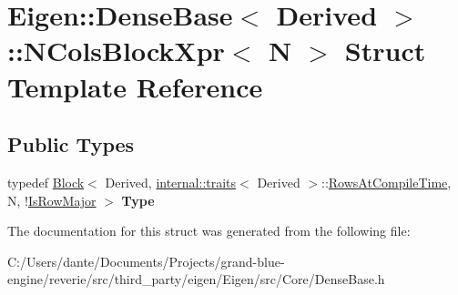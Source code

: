\hypertarget{struct_eigen_1_1_dense_base_1_1_n_cols_block_xpr}{}\section{Eigen\+::Dense\+Base$<$ Derived $>$\+::N\+Cols\+Block\+Xpr$<$ N $>$ Struct Template Reference}
\label{struct_eigen_1_1_dense_base_1_1_n_cols_block_xpr}
\subsection*{Public Types}
\begin{DoxyCompactItemize}
\item 
\mbox{\label{struct_eigen_1_1_dense_base_1_1_n_cols_block_xpr_a30874549fb3d98a13c7f8fd7f04bc3d8}} 
typedef \mbox{\hyperlink{class_eigen_1_1_block}{Block}}$<$ Derived, \mbox{\hyperlink{struct_eigen_1_1internal_1_1traits}{internal\+::traits}}$<$ Derived $>$\+::\mbox{\hyperlink{class_eigen_1_1_dense_base_a86241c772c74c04eeeb0480b99c5ab77adb37c78ebbf15aa20b65c3b70415a1ab}{Rows\+At\+Compile\+Time}}, N, !\mbox{\hyperlink{class_eigen_1_1_dense_base_a86241c772c74c04eeeb0480b99c5ab77a406b6af91d61d348ba1c9764bdd66008}{Is\+Row\+Major}} $>$ {\bfseries Type}
\end{DoxyCompactItemize}


The documentation for this struct was generated from the following file\+:\begin{DoxyCompactItemize}
\item 
C\+:/\+Users/dante/\+Documents/\+Projects/grand-\/blue-\/engine/reverie/src/third\+\_\+party/eigen/\+Eigen/src/\+Core/Dense\+Base.\+h\end{DoxyCompactItemize}
